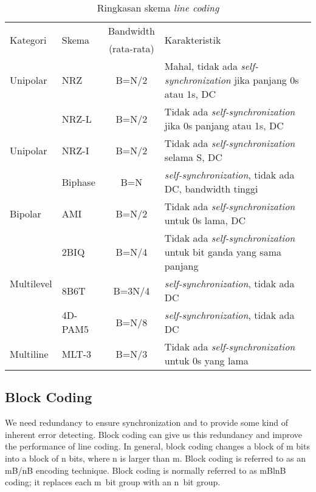\begin{table}[htbp]
  \begin{center}
    \centering
    \caption{Ringkasan skema \textit{line coding}}
    \begin{tabular}{|l|l|c|p{6cm}|}
      \cline{1-4}
      \multirow{2}{*}{Kategori} & \multirow{2}{*}{Skema} & \multicolumn{1}{c|}{Bandwidth} & \multirow{2}{*}{\centerline{Karakteristik}} \\
      & & \multicolumn{1}{c|}{(rata-rata)} & \\
      \cline{1-4}
      Unipolar & NRZ & B=N/2 & Mahal, tidak ada \textit{self-synchronization} jika panjang 0s atau 1s, DC \\
      \cline{1-4}
      \multirow{3}{*}{Unipolar} & NRZ-L & B=N/2 & Tidak ada \textit{self-synchronization} jika 0s panjang atau 1s, DC \\
      \cline{2-4}
      & NRZ-I & B=N/2 & Tidak ada \textit{self-synchronization} selama S, DC \\
      \cline{2-4}
      & Biphase & B=N & \textit{self-synchronization}, tidak ada DC, bandwidth tinggi \\
      \cline{1-4}
      Bipolar & AMI & B=N/2 & Tidak ada \textit{self-synchronization} untuk 0s lama, DC \\
      \cline{1-4}
      \multirow{3}{*}{Multilevel} & 2BIQ & B=N/4 & Tidak ada \textit{self-synchronization} untuk bit ganda yang sama panjang \\
      \cline{2-4}
      & 8B6T & B=3N/4 & \textit{self-synchronization}, tidak ada DC \\
      \cline{2-4}
      & 4D-PAM5 & B=N/8 & \textit{self-synchronization}, tidak ada DC \\
      \cline{1-4}
      Multiline & MLT-3 & B=N/3 & Tidak ada \textit{self-synchronization} untuk 0s yang lama \\
      \cline{1-4}
    \end{tabular}
  \end{center}\vspace*{6px}
\end{table}\vspace*{8px}

\subsection{Block Coding}
We need redundancy to ensure synchronization and to provide some kind of inherent error detecting. Block coding can give us this redundancy and improve the performance of line coding. In general, block coding changes a block of m bits into a block of n bits, where n is larger than m. Block coding is referred to as an mB/nB encoding technique. Block coding is normally referred to as mBlnB coding; it replaces each m~bit group with an n~bit group.

